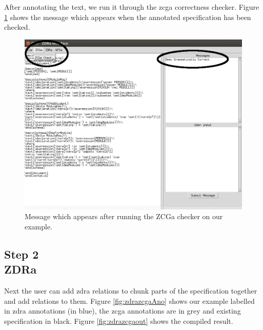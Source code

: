 After annotating the text, we run it through the \gls{zcga} correctness checker. Figure
\ref{fig:zcgacorrect} shows the message which appears when the annotated
specification has been checked. 

\begin{figure}[H]
\centering
\includegraphics[scale=0.4]{Figures/fullexample/zcgacorrect.png}
\caption{Message which appears after running the ZCGa checker on our example. \label{fig:zcgacorrect}}
\end{figure}

\subsection{Step 2\\ZDRa}

Next the user can add \gls{zdra} relations to chunk parts of the specification
together and add relations to them. Figure \ref{fig:zdrazcgaAno} shows our
example labelled in \gls{zdra} annotations (in blue), the \gls{zcga} annotations
are in grey and existing specification in black. Figure \ref{fig:zdrazcgaout}
shows the compiled result.

